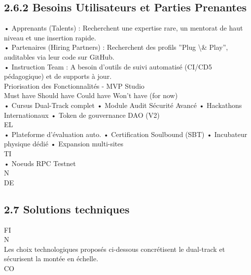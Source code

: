 \subsection{2.6.2 Besoins Utilisateurs et Parties Prenantes}
• Apprenants (Talents) : Recherchent une expertise rare, un mentorat de haut niveau et une insertion rapide.\\
• Partenaires (Hiring Partners) : Recherchent des profils ”Plug \textbackslash{}& Play”, auditables via leur code sur GitHub.\\
• Instruction Team : A besoin d’outils de suivi automatisé (CI/CD5 pédagogique) et de supports à jour.\\
\vspace{0.5em}
Priorisation des Fonctionnalités - MVP Studio\\
\vspace{0.5em}
\vspace{0.5em}
\vspace{0.5em}
Must have                               Should have                             Could have                               Won’t have (for now)\\
• Cursus Dual-Track complet             • Module Audit Sécurité Avancé          • Hackathons Internationaux              • Token de gouvernance DAO (V2)\\
\vspace{0.5em}
\vspace{0.5em}
\vspace{0.5em}
\vspace{0.5em}
EL\\
• Plateforme d’évaluation auto.         • Certification Soulbound (SBT)         • Incubateur physique dédié              • Expansion multi-sites\\
\vspace{0.5em}
\vspace{0.5em}
\vspace{0.5em}
\vspace{0.5em}
TI\\
• Noeuds RPC Testnet\\
\vspace{0.5em}
\vspace{0.5em}
\vspace{0.5em}
\vspace{0.5em}
N\\
DE\\
\subsection{2.7 Solutions techniques}
\vspace{0.5em}
\vspace{0.5em}
\vspace{0.5em}
FI\\
N\\
Les choix technologiques proposés ci-dessous concrétisent le dual-track et sécurisent la montée en échelle.\\
CO\\

